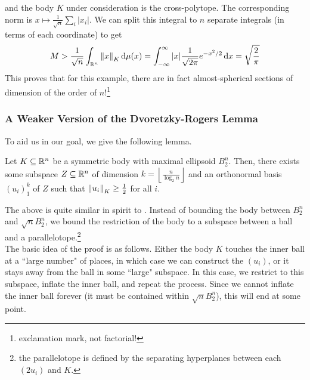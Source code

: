 and the body $K$ under consideration is the cross-polytope. The corresponding norm is $x\mapsto\frac{1}{\sqrt{n}}\sum_i |x_i|$. We can split this integral to $n$ separate integrals (in terms of each coordinate) to get
\[ M > \frac{1}{\sqrt{n}} \int_{\mathbb{R}^n} \left\lVert x\right\rVert_K \operatorname{d}\!{\mu}(x) = \int_{-\infty}^{\infty} |x| \frac{1}{\sqrt{2\pi}} e^{-x^2/2} \operatorname{d}\!{x}  = \sqrt\frac{2}{\pi} \]
This proves that for this example, there are in fact almost-spherical sections of dimension of the order of $n$!\footnote{exclamation mark, not factorial!}

\subsubsection{A Weaker Version of the Dvoretzky-Rogers Lemma}
\label{3.2.3 Dvoretzky Rogers Lemma}

To aid us in our goal, we give the following lemma.

\begin{ftheo}
\label{dvoretzky rogers lemma}
Let $K\subseteq\mathbb{R}^n$ be a symmetric body with maximal ellipsoid $B_2^n$. Then, there exists some subspace $Z\subseteq\mathbb{R}^n$ of dimension $k=\left\lfloor\frac{n}{\log_2 n}\right\rfloor$ and an orthonormal basis $(u_i)_1^k$ of $Z$ such that $\left\lVert u_i\right\rVert_{K}\geq \frac{1}{2}$ for all $i$.
\end{ftheo}

The above is quite similar in spirit to . Instead of bounding the body between $B_2^n$ and $\sqrt{n}B_2^n$, we bound the restriction of the body to a subspace between a ball and a parallelotope.\footnote{the parallelotope is defined by the separating hyperplanes between each $(2u_i)$ and $K$.}\\

The basic idea of the proof is as follows. Either the body $K$ touches the inner ball at a ``large number" of places, in which case we can construct the $(u_i)$, or it stays away from the ball in some ``large" subspace. In this case, we restrict to this subspace, inflate the inner ball, and repeat the process. Since we cannot inflate the inner ball forever (it must be contained within $\sqrt{n}B_2^n$), this will end at some point.

